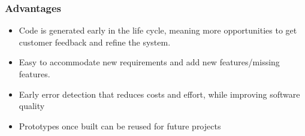 \documentclass{article}
\begin{document}
\subsubsection{Advantages}
\begin{itemize}
    \item Code is generated early in the life cycle, meaning more opportunities to get customer feedback and refine the system.
    
    \item Easy to accommodate new requirements and add new features/missing features. 
    
    \item Early error detection that reduces costs and effort, while improving software quality
    
    \item Prototypes once built can be reused for future projects
\end{itemize}
\end{document}
